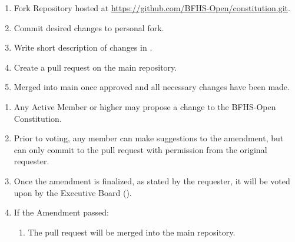 
\begin{enumerate}
	\item Fork Repository hosted at \href{https://github.com/BFHS-Open/constitution.git}{https://github.com/BFHS-Open/constitution.git}.

	\item Commit desired changes to personal fork.

	\item Write short description of changes in .

	\item Create a pull request on the main repository.

	\item Merged into main once approved and all necessary changes have been made.
\end{enumerate}

\begin{enumerate}
	\item Any Active Member or higher may propose a change to the BFHS-Open Constitution.

	\item Prior to voting, any member can make suggestions to the amendment, but can
		only commit to the pull request with permission from the original requester.

	\item Once the amendment is finalized, as stated by the requester, it will be voted
		upon by the Executive Board ().

	\item If the Amendment passed:
		\begin{enumerate}
			\item The pull request will be merged into the main repository.
		\end{enumerate}
\end{enumerate}